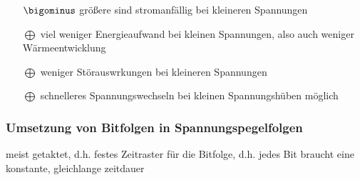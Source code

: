\documentclass[10pt,a4paper]{scrartcl}
\begin{document}
\begin{itemize}
	\item[$\bigominus$] größere sind stromanfällig bei kleineren Spannungen
	\item[$\bigoplus$] viel weniger Energieaufwand bei kleinen Spannungen, also auch weniger Wärmeentwicklung
	\item[$\bigoplus$] weniger Störauswrkungen bei kleineren Spannungen
	\item[$\bigoplus$] schnelleres Spannungswechseln bei kleinen Spannungshüben möglich
\end{itemize}

\subsubsection{Umsetzung von Bitfolgen in Spannungspegelfolgen}
\hspace*{2em} meist getaktet, d.h. festes Zeitraster für die Bitfolge, d.h. jedes Bit braucht eine konstante, gleichlange zeitdauer
\end{document}
